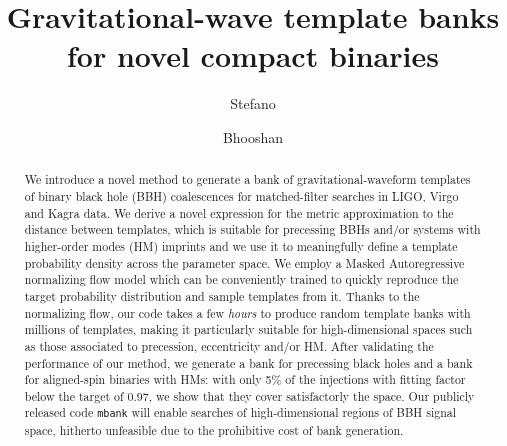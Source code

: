 \documentclass[twocolumn,showpacs,preprintnumbers,nofootinbib,prd,
superscriptaddress,10pt]{revtex4-2}
\begin{document}
\begin{abstract}
	We introduce a novel method to generate a bank of gravitational-waveform templates of binary black hole (BBH) coalescences for matched-filter searches in LIGO, Virgo and Kagra data.
	We derive a novel expression for the metric approximation to the distance between templates, which is suitable for precessing BBHs and/or systems with higher-order modes (HM) imprints and we use it to meaningfully define a template probability density across the parameter space.
	We employ a Masked Autoregressive normalizing flow model which can be conveniently trained to quickly reproduce the target probability distribution and sample templates from it.
	Thanks to the normalizing flow, our code takes a few {\it hours} to produce random template banks with millions of templates, making it particularly suitable for high-dimensional spaces such as those associated to precession, eccentricity and/or HM.
	After validating the performance of our method, we generate a bank for precessing black holes and a bank for aligned-spin binaries with HMs: with only 5\% of the injections with fitting factor below the target of $0.97$, we show that they cover satisfactorly the space.
	Our publicly released code \texttt{mbank} will enable searches of high-dimensional regions of BBH signal space, hitherto unfeasible due to the prohibitive cost of bank generation.
	
\end{abstract}
	
 \title{Gravitational-wave template banks for novel compact binaries}
	\author{Stefano }

	\author{Bhooshan }
        
\end{document}
